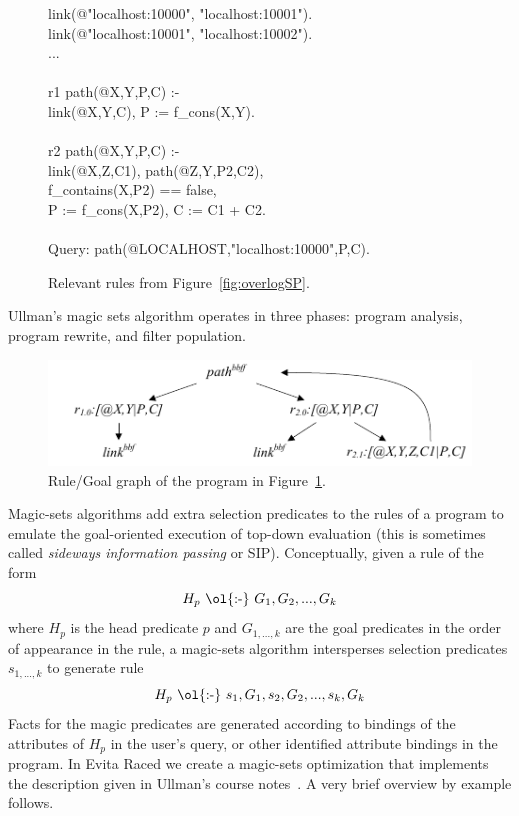\begin{figure}[!t]
\ssp
\centering
\begin{boxedminipage}{\linewidth}
link(@"localhost:10000", "localhost:10001").\\
link(@"localhost:10001", "localhost:10002").\\
...\\
\\
r1 path(@X,Y,P,C) :- \\
\datalogspace link(@X,Y,C), P := f\_cons(X,Y). \\
\\
r2 path(@X,Y,P,C) :- \\
\datalogspace link(@X,Z,C1), path(@Z,Y,P2,C2),\\
\datalogspace f\_contains(X,P2) == false, \\
\datalogspace P := f\_cons(X,P2), C := C1 + C2. \\
\\
Query: path(@LOCALHOST,"localhost:10000",P,C).
\end{boxedminipage}
\caption{\label{fig:querySP}Relevant rules from Figure~\ref{fig:overlogSP}.}
\end{figure}

Ullman's magic sets algorithm operates in three phases: program analysis,
program rewrite, and filter population.
\begin{figure}[!t]
\begin{center}
\includegraphics[scale=2.0]{figures/RuleGoalGraph}
\caption{Rule/Goal graph of the program in Figure~\ref{fig:querySP}.}
\label{fig:rggraph}
\end{center}
\end{figure}


Magic-sets algorithms add extra selection predicates to the rules of a program to
emulate the goal-oriented execution of top-down evaluation (this is
sometimes called \emph{sideways information passing} or
SIP). Conceptually, given a rule of the form
\[
H_p \ \text{\ol{:-}}\  G_1, G_2, ..., G_k
\]
where $H_p$ is the head predicate $p$ and $G_{1,...,k}$ are the goal
predicates in the order of appearance in the rule, a magic-sets
algorithm intersperses selection predicates $s_{1,...,k}$ to generate rule
\[
H_p \ \text{\ol{:-}}\  s_1, G_1, s_2, G_2, ..., s_{k}, G_k
\]
Facts for the magic predicates are generated according to bindings of
the attributes of $H_p$ in the user's query, or other identified
attribute bindings in the program. In Evita Raced we create a magic-sets
optimization that implements the description given in Ullman's course notes~\cite{ullmanNotes}. 
A very brief overview by example follows.



